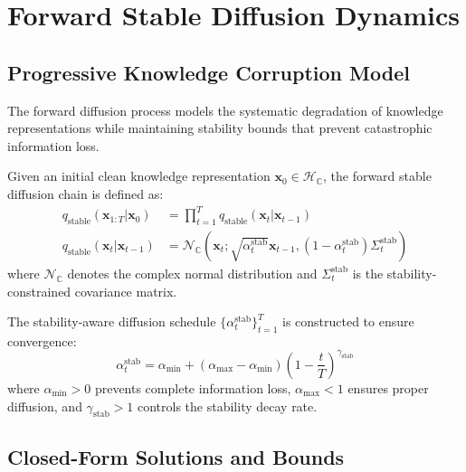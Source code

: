 \section{Forward Stable Diffusion Dynamics}

\subsection{Progressive Knowledge Corruption Model}

The forward diffusion process models the systematic degradation of knowledge representations while maintaining stability bounds that prevent catastrophic information loss.

\begin{definition}
Given an initial clean knowledge representation $\mathbf{x}_0 \in \mathcal{H}_{\mathbb{C}}$, the forward stable diffusion chain is defined as:
\begin{align}
q_{\text{stable}}(\mathbf{x}_{1:T} | \mathbf{x}_0) &= \prod_{t=1}^T q_{\text{stable}}(\mathbf{x}_t | \mathbf{x}_{t-1}) \\
q_{\text{stable}}(\mathbf{x}_t | \mathbf{x}_{t-1}) &= \mathcal{N}_{\mathbb{C}}(\mathbf{x}_t; \sqrt{\alpha_t^{\text{stab}}} \mathbf{x}_{t-1}, (1-\alpha_t^{\text{stab}}) \Sigma_t^{\text{stab}})
\end{align}
where $\mathcal{N}_{\mathbb{C}}$ denotes the complex normal distribution and $\Sigma_t^{\text{stab}}$ is the stability-constrained covariance matrix.
\end{definition}

\begin{definition}
The stability-aware diffusion schedule $\{\alpha_t^{\text{stab}}\}_{t=1}^T$ is constructed to ensure convergence:
\begin{equation}
\alpha_t^{\text{stab}} = \alpha_{\text{min}} + (\alpha_{\text{max}} - \alpha_{\text{min}}) \left(1 - \frac{t}{T}\right)^{\gamma_{\text{stab}}}
\end{equation}
where $\alpha_{\text{min}} > 0$ prevents complete information loss, $\alpha_{\text{max}} < 1$ ensures proper diffusion, and $\gamma_{\text{stab}} > 1$ controls the stability decay rate.
\end{definition}

\subsection{Closed-Form Solutions and Bounds}

